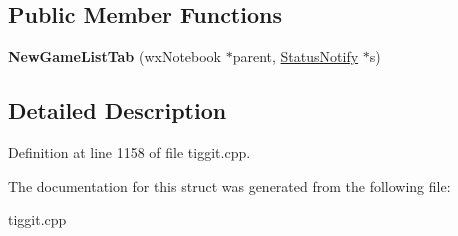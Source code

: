 \subsection*{Public Member Functions}
\begin{DoxyCompactItemize}
\item 
\hypertarget{struct_new_game_list_tab_aed520c852a1c799ab27302147a1e89fe}{{\bfseries New\-Game\-List\-Tab} (wx\-Notebook $\ast$parent, \hyperlink{struct_status_notify}{Status\-Notify} $\ast$s)}\label{struct_new_game_list_tab_aed520c852a1c799ab27302147a1e89fe}

\end{DoxyCompactItemize}


\subsection{Detailed Description}


Definition at line 1158 of file tiggit.\-cpp.



The documentation for this struct was generated from the following file\-:\begin{DoxyCompactItemize}
\item 
tiggit.\-cpp\end{DoxyCompactItemize}
